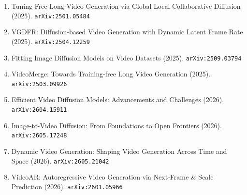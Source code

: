 \documentclass[11pt]{article}
\begin{document}
\begin{enumerate}
  \item Tuning-Free Long Video Generation via Global-Local Collaborative
  Diffusion (2025). \texttt{arXiv:2501.05484}
  \item VGDFR: Diffusion-based Video Generation with Dynamic Latent Frame Rate (2025). \texttt{arXiv:2504.12259}
  \item Fitting Image Diffusion Models on Video Datasets (2025). \texttt{arXiv:2509.03794}
  \item VideoMerge: Towards Training-free Long Video Generation (2025). \texttt{arXiv:2503.09926}
  \item Efficient Video Diffusion Models: Advancements and Challenges (2026). \texttt{arXiv:2604.15911}
  \item Image-to-Video Diffusion: From Foundations to Open Frontiers (2026). \texttt{arXiv:2605.17248}
  \item Dynamic Video Generation: Shaping Video Generation Across Time and Space (2026). \texttt{arXiv:2605.21042}
  \item VideoAR: Autoregressive Video Generation via Next-Frame \& Scale Prediction (2026). \texttt{arXiv:2601.05966}
\end{enumerate}
\end{document}
